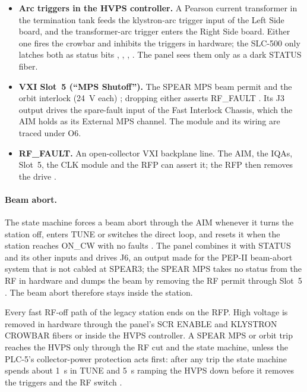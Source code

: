\begin{itemize}
the controller's ``24~V fault/enable'' output is high and no crowbar is commanded;
the panel receives STATUS as the ``HVPS beam abort'' , .
\item \textbf{Arc triggers in the HVPS controller.} A Pearson current transformer in
the termination tank feeds the klystron-arc trigger input of the Left Side board, and
the transformer-arc trigger enters the Right Side board. Either one fires the crowbar
and inhibits the triggers in hardware; the SLC-500 only latches both as status bits
, , , . The panel sees them only as a dark STATUS fiber.
\item \textbf{VXI Slot~5 (``MPS Shutoff'').} The SPEAR MPS beam permit and the orbit
interlock (\qty{24}{\volt} each) ; dropping either asserts RF\_FAULT . Its
J3 output drives the spare-fault input of the Fast Interlock Chassis, which the AIM
holds as its External MPS channel. The module and its wiring are traced under O6.
\item \textbf{RF\_FAULT.} An open-collector VXI backplane line. The AIM, the IQAs,
Slot~5, the CLK module and the RFP can assert it; the RFP then removes the drive
.
\end{itemize}

\paragraph{Beam abort.} The state machine forces a beam abort through the AIM whenever
it turns the station off, enters TUNE or switches the direct loop, and resets it when
the station reaches ON\_CW with no faults . The panel combines it with STATUS and
its other inputs and drives J6, an output made for the PEP-II beam-abort system 
that is not cabled at SPEAR3; the SPEAR MPS takes no status from the RF in hardware
and dumps the beam by removing the RF permit through Slot~5 . The beam abort
therefore stays inside the station.

\begin{warnbox}
Every fast RF-off path of the legacy station ends on the RFP. High voltage is removed
in hardware through the panel's SCR ENABLE and KLYSTRON CROWBAR fibers or inside the
HVPS controller. A SPEAR MPS or orbit trip reaches the HVPS only through the RF cut and
the state machine, unless the PLC-5's collector-power protection acts first: after any
trip the state machine spends about \qty{1}{\second} in TUNE and \qty{5}{\second}
ramping the HVPS down before it removes the triggers and the RF switch .
\end{warnbox}


